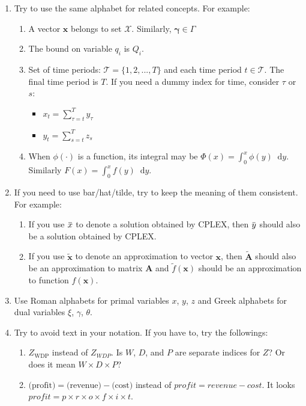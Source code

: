 \documentclass[letterpaper, 11pt]{article}
\renewcommand{\vec}[1]{\boldsymbol{\mathbf{#1}}}
\newcommand{\mat}[1]{\vec{#1}}
\newcommand{\set}[1]{\mathcal{#1}}
\newcommand{\dy}{\mathop{}\!\mathrm{d}y}
\renewcommand{\bar}[1]{\mkern 1.5mu\overline{\mkern-1.5mu#1\mkern-1.5mu}\mkern 1.5mu}
\begin{document}
\begin{enumerate}
\item Try to use the same alphabet for related concepts. For example:
	\begin{enumerate}
	\item A vector $\vec{x}$ belongs to set $\set{X}$. Similarly, $\vec{\gamma}\in\set{\Gamma}$
	\item The bound on variable $q_i$ is $Q_i$.
	\item Set of time periods: $\set{T} = \{1,2,...,T\}$ and each time period $t\in\set{T}$. The final time period is $T$. If you need a dummy index for time, consider $\tau$ or $s$:
		\begin{itemize}
		\item $\displaystyle x_t = \sum_{\tau=t}^T y_\tau$
		\item $\displaystyle y_t = \sum_{s=t}^T z_s$		
		\end{itemize}
	\item When $\phi(\cdot)$ is a function, its integral may be $\Phi(x) = \int_0^x \phi(y) \dy$. Similarly $F(x) = \int_0^x f(y) \dy$.
	\end{enumerate}
\item If you need to use bar/hat/tilde, try to keep the meaning of them consistent. For example:
	\begin{enumerate}
	\item If you use $\bar{x}$ to denote a solution obtained by CPLEX, then $\bar{y}$ should also be a solution obtained by CPLEX.
	\item If you use $\tilde{\vec{x}}$ to denote an approximation to vector $\vec{x}$, then $\tilde{\mat{A}}$ should also be an approximation to matrix $\mat{A}$ and $\tilde{f}(\vec{x})$ should be an approximation to function $f(\vec{x})$.
	\end{enumerate}
\item Use Roman alphabets for primal variables $x$, $y$, $z$ and Greek alphabets for dual variables $\xi$, $\gamma$, $\theta$.
\item Try to avoid text in your notation. If you have to, try the followings:
	\begin{enumerate}
	\item $Z_{\text{WDP}}$ instead of $Z_{WDP}$. Is $W$, $D$, and $P$ are separate indices for $Z$? Or does it mean $W \times D \times P$?
	\item $\text{(profit)} = \text{(revenue)} - \text{(cost)} $ instead of $profit = revenue - cost$. It looks $profit = p\times r\times o\times f\times i\times t$.

\end{enumerate}
\end{enumerate}
\end{document}
